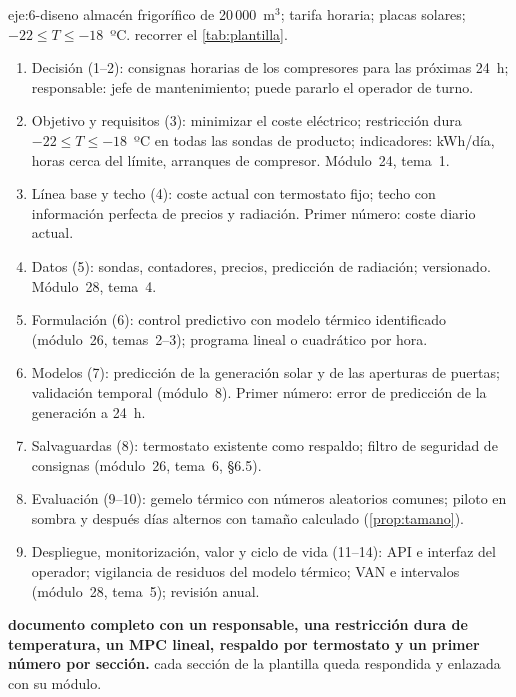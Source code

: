 \begin{solucion}{eje:6-diseno}
\datos almacén frigorífico de 20\,000~m$^{3}$; tarifa horaria; placas solares; $-22\le T\le-18$~ºC.
\planteamiento recorrer el \cref{tab:plantilla}.
\pasos
\begin{enumerate}[label=\arabic*.]
  \item Decisión (1--2): consignas horarias de los compresores para las próximas 24~h; responsable: jefe de mantenimiento; puede pararlo el operador de turno.
  \item Objetivo y requisitos (3): minimizar el coste eléctrico; restricción dura $-22\le T\le-18$~ºC en todas las sondas de producto; indicadores: kWh/día, horas cerca del límite, arranques de compresor. Módulo~24, tema~1.
  \item Línea base y techo (4): coste actual con termostato fijo; techo con información perfecta de precios y radiación. Primer número: coste diario actual.
  \item Datos (5): sondas, contadores, precios, predicción de radiación; versionado. Módulo~28, tema~4.
  \item Formulación (6): control predictivo con modelo térmico identificado (módulo~26, temas~2--3); programa lineal o cuadrático por hora.
  \item Modelos (7): predicción de la generación solar y de las aperturas de puertas; validación temporal (módulo~8). Primer número: error de predicción de la generación a 24~h.
  \item Salvaguardas (8): termostato existente como respaldo; filtro de seguridad de consignas (módulo~26, tema~6, §6.5).
  \item Evaluación (9--10): gemelo térmico con números aleatorios comunes; piloto en sombra y después días alternos con tamaño calculado (\cref{prop:tamano}).
  \item Despliegue, monitorización, valor y ciclo de vida (11--14): API e interfaz del operador; vigilancia de residuos del modelo térmico; VAN e intervalos (módulo~28, tema~5); revisión anual.
\end{enumerate}
\resultado \textbf{documento completo con un responsable, una restricción dura de temperatura, un MPC lineal, respaldo por termostato y un primer número por sección.}
\comprobacion cada sección de la plantilla queda respondida y enlazada con su módulo.
\end{solucion}
